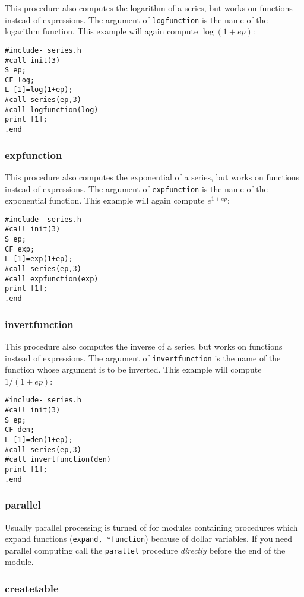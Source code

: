 \documentclass{article}
\begin{document}
This procedure also computes the logarithm of a series, but works on
functions instead of expressions. The argument of {\tt logfunction} is
the name of the logarithm function. This example will again compute $\log(1+ep)$:
\begin{verbatim}
#include- series.h
#call init(3)
S ep;
CF log;
L [1]=log(1+ep);
#call series(ep,3)
#call logfunction(log)
print [1];
.end
\end{verbatim}

\subsubsection{expfunction}
\label{sec:exp_fun}

This procedure also computes the exponential of a series, but works on
functions instead of expressions. The argument of {\tt expfunction} is
the name of the exponential function. This example will again compute $e^{1+ep}$:
\begin{verbatim}
#include- series.h
#call init(3)
S ep;
CF exp;
L [1]=exp(1+ep);
#call series(ep,3)
#call expfunction(exp)
print [1];
.end
\end{verbatim}

\subsubsection{invertfunction}
\label{sec:inv_fun}

This procedure also computes the inverse of a series, but works on
functions instead of expressions. The argument of {\tt invertfunction} is
the name of the function whose argument is to be inverted. This example will compute $1/(1+ep)$:
\begin{verbatim}
#include- series.h
#call init(3)
S ep;
CF den;
L [1]=den(1+ep);
#call series(ep,3)
#call invertfunction(den)
print [1];
.end
\end{verbatim}

\subsubsection{parallel}
\label{sec:parallel}

Usually parallel processing is turned of for modules containing
procedures which expand functions ({\tt expand, *function}) because of
dollar variables. If you need
parallel computing call the {\tt parallel} procedure {\em directly}
  before the end of the module.

\subsubsection{createtable}
\label{sec:createtable}
\end{document}

